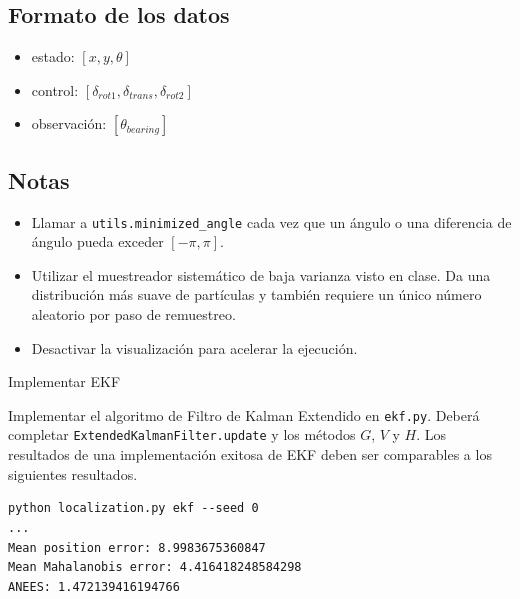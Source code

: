 \documentclass[tp]{lcc}
\begin{document}
	\subsection{Formato de los datos}

	\begin{itemize}
		\item estado: $[x,y,\theta]$
		\item control: $[\delta_{rot1},\delta_{trans},\delta_{rot2}]$
		\item observación: $[\theta_{bearing}]$
	\end{itemize}
	
	\subsection{Notas}
	\begin{itemize}
		\item Llamar a \lstinline[style=bash]{utils.minimized_angle} cada vez que un ángulo o una diferencia de ángulo pueda exceder $[-\pi, \pi]$.
		\item Utilizar el muestreador sistemático de baja varianza visto en clase. Da una distribución más suave de partículas y también requiere un único número aleatorio por paso de remuestreo.
		\item Desactivar la visualización para acelerar la ejecución.
	\end{itemize}

	\ejercicio Implementar EKF
    
	Implementar el algoritmo de Filtro de Kalman Extendido en \lstinline[style=bash]{ekf.py}. Deberá completar \lstinline[style=bash]{ExtendedKalmanFilter.update} y los métodos $G$, $V$ y $H$. Los resultados de una implementación exitosa de EKF deben ser comparables a los siguientes resultados.

\begin{lstlisting}[style=bash] 
python localization.py ekf --seed 0
...
Mean position error: 8.9983675360847
Mean Mahalanobis error: 4.416418248584298
ANEES: 1.472139416194766
\end{lstlisting}
\end{document}
